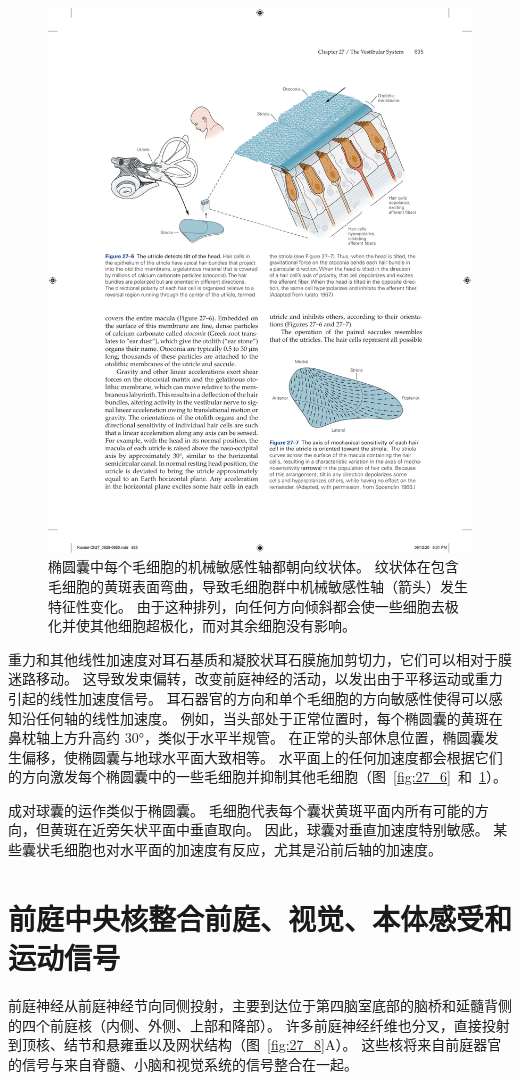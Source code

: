 \begin{figure}[htbp]
	\centering
	\includegraphics[width=0.5\linewidth]{chap27/fig_27_7}
	\caption{椭圆囊中每个毛细胞的机械敏感性轴都朝向纹状体。
		纹状体在包含毛细胞的黄斑表面弯曲，导致毛细胞群中机械敏感性轴（箭头）发生特征性变化。
		由于这种排列，向任何方向倾斜都会使一些细胞去极化并使其他细胞超极化，而对其余细胞没有影响\cite{spoendlin2016ultrastructure}。}
	\label{fig:27_7}
\end{figure}


重力和其他线性加速度对耳石基质和凝胶状耳石膜施加剪切力，它们可以相对于膜迷路移动。
这导致发束偏转，改变前庭神经的活动，以发出由于平移运动或重力引起的线性加速度信号。
耳石器官的方向和单个毛细胞的方向敏感性使得可以感知沿任何轴的线性加速度。
例如，当头部处于正常位置时，每个椭圆囊的黄斑在鼻枕轴上方升高约 30°，类似于水平半规管。
在正常的头部休息位置，椭圆囊发生偏移，使椭圆囊与地球水平面大致相等。
水平面上的任何加速度都会根据它们的方向激发每个椭圆囊中的一些毛细胞并抑制其他毛细胞（图~\ref{fig:27_6}~和~\ref{fig:27_7}）。


成对球囊的运作类似于椭圆囊。
毛细胞代表每个囊状黄斑平面内所有可能的方向，但黄斑在近旁矢状平面中垂直取向。
因此，球囊对垂直加速度特别敏感。
某些囊状毛细胞也对水平面的加速度有反应，尤其是沿前后轴的加速度。



\section{前庭中央核整合前庭、视觉、本体感受和运动信号}

前庭神经从前庭神经节向同侧投射，主要到达位于第四脑室底部的脑桥和延髓背侧的四个前庭核（内侧、外侧、上部和降部）。
许多前庭神经纤维也分叉，直接投射到顶核、结节和悬雍垂以及网状结构（图~\ref{fig:27_8}A）。 
这些核将来自前庭器官的信号与来自脊髓、小脑和视觉系统的信号整合在一起。


